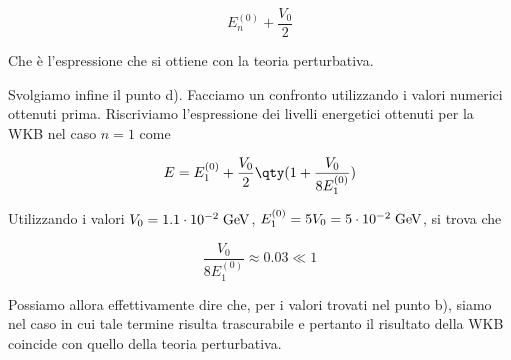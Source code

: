 \begin{soluzione}
   \begin{equation*}
      E_n^{(0)} + \frac{V_0}{2}
   \end{equation*}

   Che è l'espressione che si ottiene con la teoria perturbativa.
   
   Svolgiamo infine il punto d). Facciamo un confronto utilizzando i valori numerici ottenuti prima. Riscriviamo l'espressione dei livelli energetici ottenuti per la WKB nel caso $n=1$ come
   
   \begin{equation*}
      E=E_1^{(0)} + \frac{V_0}{2} \qty( 1 + \frac{V_0}{8 E_1^{(0)}} )
   \end{equation*}

   Utilizzando i valori $V_0=1.1 \cdot 10^{-2} \; \rm GeV$, $E_1^{(0)}=5V_0=5 \cdot 10^{-2} \; \rm GeV$, si trova che
   
   \begin{equation*}
      \frac{V_0}{8 E_1^{(0)}} \approx 0.03 \ll 1
   \end{equation*}
   
   Possiamo allora effettivamente dire che, per i valori trovati nel punto b), siamo nel caso in cui tale termine risulta trascurabile e pertanto il risultato della WKB coincide con quello della teoria perturbativa.
\end{soluzione}

\newpage
\setcounter{equation}{0}

